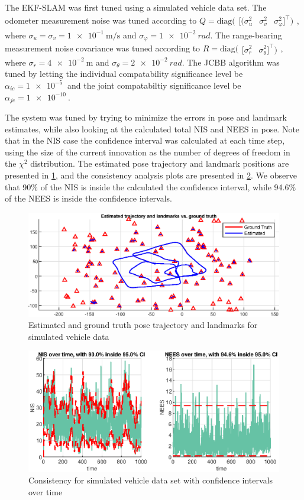 The EKF-SLAM was first tuned using a simulated vehicle data set. The odometer measurement noise was tuned according to $Q = \text{diag}(\begin{array}{ccc}[(\sigma_u^2 & \sigma_v^2 & \sigma_\varphi^2 ]^{\top})\end{array}$, where $\sigma_u = \sigma_v = \SI{1e-1}{\meter\per\second}$ and $\sigma_\varphi = \SI{1e-2}{rad}$. The range-bearing measurement noise covariance was tuned according to $R = \text{diag}(\begin{array}{cc}[\sigma_r^2 & \sigma_\theta^2 ]^{\top})\end{array}$, where $\sigma_r = \SI{4e-2}{\meter}$ and $\sigma_\theta = \SI{2e-2}{rad}$. The JCBB algorithm was tuned by letting the individual compatability significance level be $\alpha_{ic} = \SI{1e-5}{}$ and the joint compatabiltiy significance level be $\alpha_{jc} = \SI{1e-10}{}$.

The system was tuned by trying to minimize the errors in pose and landmark estimates, while also looking at the calculated total NIS and NEES in pose. Note that in the NIS case the confidence interval was calculated at each time step, using the size of the current innovation as the number of degrees of freedom in the $\chi^2$ distribution. The estimated pose trajectory and landmark positions are presented in \cref{fig:ga_3_sim_trajectory}, and the consistency analysis plots are presented in \cref{fig:ga_3_sim_NIS}. We observe that 90\% of the NIS is inside the calculated the confidence interval, while 94.6\% of the NEES is inside the confidence intervals.

\begin{figure}[!htb]
    \centering
    \includegraphics[width=0.6\linewidth]{figures/ga_3/sim_trajectory.eps}
    \caption{Estimated and ground truth pose trajectory and landmarks for simulated vehicle data}
    \label{fig:ga_3_sim_trajectory}
\end{figure}

\begin{figure}[!htb]
    \centering
    \includegraphics[width=0.8\linewidth]{figures/ga_3/sim_NIS.eps}
    \caption{Consistency for simulated vehicle data set with confidence intervals over time}
    \label{fig:ga_3_sim_NIS}
\end{figure}

